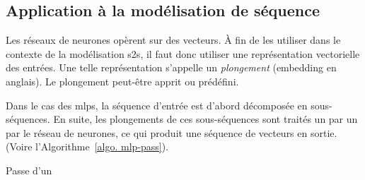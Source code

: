 \subsection{Application à la modélisation de séquence}

Les réseaux de neurones opèrent sur des vecteurs.
À fin de les utiliser dans le contexte de la modélisation \gls{s2s}, 
il faut donc utiliser une représentation vectorielle des entrées.
Une telle représentation s'appelle un \emph{plongement} (\foreignlanguage{english}{embedding} en anglais).
Le plongement peut-être apprit ou prédéfini.

Dans le cas des \glspl{mlp}, la séquence d'entrée est d'abord décomposée en sous-séquences.
En suite, les plongements de ces sous-séquences sont traités un par un par le réseau de neurones,
ce qui produit une séquence de vecteurs en sortie.
(Voire l'Algorithme~\ref{algo. mlp-pass}).

\begin{algorithm}[htb]
    \caption{Passe d'un }
    \label{algo. mlp-pass}
\end{algorithm}
